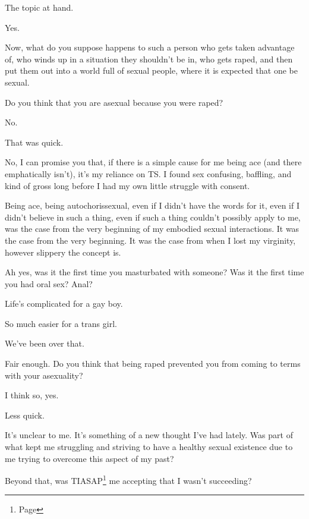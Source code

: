 \begin{ally}
The topic at hand.
\end{ally}
Yes.

Now, what do you suppose happens to such a person who gets taken advantage of, who winds up in a situation they shouldn't be in, who gets raped, and then put them out into a world full of sexual people, where it is expected that one be sexual.
\newpage

\begin{ally}
Do you think that you are asexual because you were raped?
\end{ally}
No.

\begin{ally}
That was quick.
\end{ally}
No, I can promise you that, if there is a simple cause for me being ace (and there emphatically isn't), it's my reliance on TS. I found sex confusing, baffling, and kind of gross long before I had my own little struggle with consent.

Being ace, being autochorissexual, even if I didn't have the words for it, even if I didn't believe in such a thing, even if such a thing couldn't possibly apply to me, was the case from the very beginning of my embodied sexual interactions. It was the case from the very beginning. It was the case from when I lost my virginity, however slippery the concept is.

\begin{ally}
Ah yes, was it the first time you masturbated with someone? Was it the first time you had oral sex? Anal?
\end{ally}
Life's complicated for a gay boy.

\begin{ally}
So much easier for a trans girl.
\end{ally}
We've been over that.

\begin{ally}
Fair enough. Do you think that being raped prevented you from coming to terms with your asexuality?
\end{ally}
I think so, yes.

\begin{ally}
Less quick.
\end{ally}
It's unclear to me. It's something of a new thought I've had lately. Was part of what kept me struggling and striving to have a healthy sexual existence due to me trying to overcome this aspect of my past?

Beyond that, was TIASAP\footnote{\color[HTML]{dccccc}Page \pageref{selfharm:selfharm}} me accepting that I wasn't succeeding?

